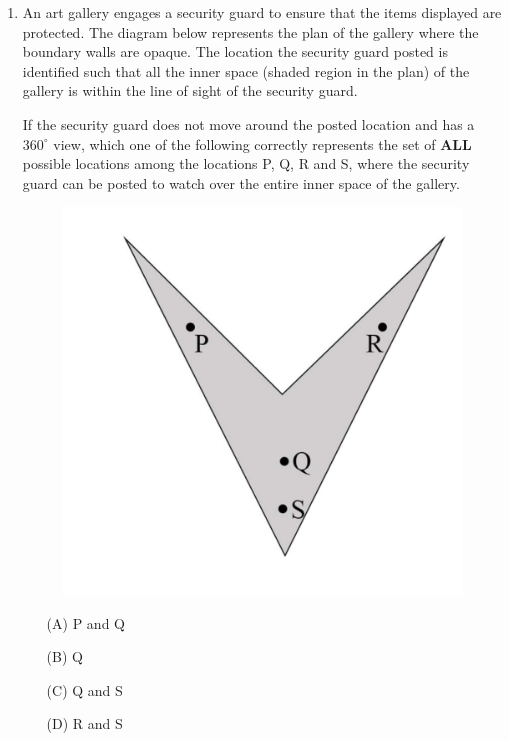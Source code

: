 \documentclass[journal,12pt,onecolumn]{IEEEtran}
\theoremstyle{remark}
\begin{document}
\begin{enumerate}
\begin{multicols}{4}
  
\begin{enumerate}
	\item [(A)] 15
	\item [(B)] 20
	\item [(C)] 21
	\item [(D)] 26
\end{enumerate}

\end{multicols}


\hfill(GATE NM 2022)






\item  An art gallery engages a security guard to ensure that the items displayed are protected. The diagram below represents the plan of the gallery where the boundary walls are opaque. The location the security guard posted is identified such that all the inner space (shaded region in the plan) of the gallery is within the line of sight of the security guard.  

If the security guard does not move around the posted location and has a $360^\circ$ view, which one of the following correctly represents the set of \textbf{ALL} possible locations among the locations P, Q, R and S, where the security guard can be posted to watch over the entire inner space of the gallery.  

\begin{figure}[h]
	\centering
	\includegraphics[width=0.3\columnwidth]{fig2}
	\caption{}
	\label{fig:placeholder}
\end{figure}

\begin{multicols}{4}

\begin{enumerate}
    \item[(A)] P and Q
    \item[(B)] Q
    \item[(C)] Q and S
    \item[(D)] R and S
\end{enumerate}


\end{multicols}
\end{enumerate}
\end{document}
